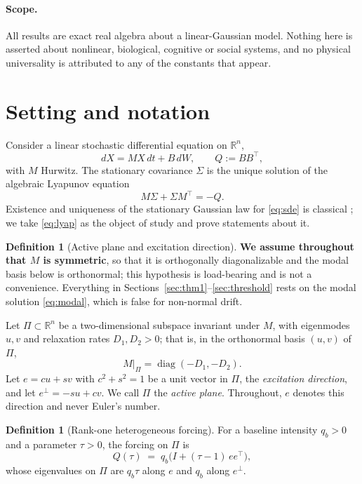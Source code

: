 \documentclass[11pt]{article}
\theoremstyle{plain}
\theoremstyle{definition}
\newtheorem{definition}[theorem]{Definition}
\theoremstyle{remark}
\newcommand{\Real}{\mathbb{R}}
\newcommand{\Sig}{\Sigma}
\newcommand{\eperp}{e^{\perp}}
\newcommand{\T}{^{\!\top}}
\begin{document}
\paragraph{Scope.} All results are exact real algebra about a linear-Gaussian model. Nothing here
is asserted about nonlinear, biological, cognitive or social systems, and no physical universality
is attributed to any of the constants that appear.

\section{Setting and notation}\label{sec:setting}

Consider a linear stochastic differential equation on $\Real^n$,
\begin{equation}
  dX = MX\,dt + B\,dW, \qquad Q := BB\T, \label{eq:sde}
\end{equation}
with $M$ Hurwitz. The stationary covariance $\Sig$ is the unique solution of the algebraic
Lyapunov equation
\begin{equation}
  M\Sig + \Sig M\T = -Q. \label{eq:lyap}
\end{equation}
Existence and uniqueness of the stationary Gaussian law for \eqref{eq:sde} is classical
\cite{Gardiner2004,Vatiwutipong2019}; we take \eqref{eq:lyap} as the object of study and prove
statements about it.

\begin{definition}[Active plane and excitation direction]\label{def:active}
\textbf{We assume throughout that $M$ is symmetric}, so that it is orthogonally diagonalizable
and the modal basis below is orthonormal; this hypothesis is load-bearing and is not a
convenience. Everything in Sections~\ref{sec:thm1}--\ref{sec:threshold} rests on the modal
solution \eqref{eq:modal}, which is false for non-normal drift.

Let $\Pi\subset\Real^n$ be a two-dimensional subspace invariant under $M$, with eigenmodes
$u,v$ and relaxation rates $D_1,D_2>0$; that is, in the orthonormal basis $(u,v)$ of $\Pi$,
\[
  M|_\Pi = \operatorname{diag}(-D_1,-D_2).
\]
Let $e=cu+sv$ with $c^2+s^2=1$ be a unit vector in $\Pi$, the \emph{excitation direction}, and let
$\eperp=-su+cv$. We call $\Pi$ the \emph{active plane}. Throughout, $e$ denotes this direction and
never Euler's number.
\end{definition}

\begin{definition}[Rank-one heterogeneous forcing]\label{def:forcing}
For a baseline intensity $q_b>0$ and a parameter $\tau>0$, the forcing on $\Pi$ is
\begin{equation}
  Q(\tau) \;=\; q_b\bigl(I + (\tau-1)\,ee\T\bigr), \label{eq:forcing}
\end{equation}
whose eigenvalues on $\Pi$ are $q_b\tau$ along $e$ and $q_b$ along $\eperp$.
\end{definition}
\end{document}
